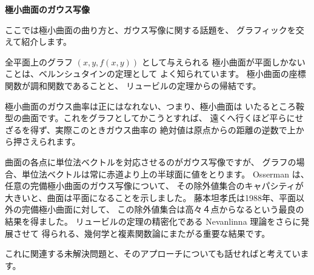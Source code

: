 \documentclass[uplatex,dvipdfmx]{jlreq}
\begin{document}
\newpage

\begin{center}
{\Large\bfseries 極小曲面のガウス写像}

\hspace*{\fill}{\large\bfseries 宮岡 礼子（上智大・理工）}
\end{center}

\bigskip

ここでは極小曲面の曲り方と、ガウス写像に関する話題を、
グラフィックを交えて紹介します。

全平面上のグラフ $(x,y,f(x,y))$ として与えられる
極小曲面が平面しかないことは、ベルンシュタインの定理として
よく知られています。
極小曲面の座標関数が調和関数であることと、
リュービルの定理からの帰結です。

極小曲面のガウス曲率は正にはなれない、つまり、極小曲面は
いたるところ鞍型の曲面です。これをグラフとしてかこうとすれば、
遠くへ行くほど平らにせざるを得ず、実際このときガウス曲率の
絶対値は原点からの距離の逆数で上から押さえられます。

曲面の各点に単位法ベクトルを対応させるのがガウス写像ですが、
グラフの場合、単位法ベクトルは常に赤道より上の半球面に値をとります。
Osserman は、任意の完備極小曲面のガウス写像について、
その除外値集合のキャパシティが大きいと、曲面は平面になることを示しました。
藤本坦孝氏は1988年、平面以外の完備極小曲面に対して、
この除外値集合は高々４点からなるという最良の結果を得ました。
リュービルの定理の精密化である Nevanlinna 理論をさらに発展させて
得られる、幾何学と複素関数論にまたがる重要な結果です。

これに関連する未解決問題と、そのアプローチについても話せればと考えています。
\end{document}
